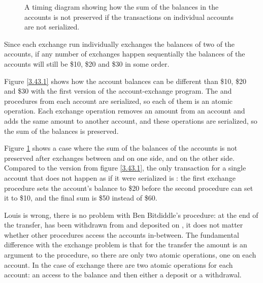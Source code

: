 \begin{exe}[3.43]
\begin{figure}
        \caption{A timing diagram showing how the sum of the balances in the 
        accounts is not preserved if the transactions on individual accounts are 
        not serialized.}
        \label{3.43.2}
    \end{figure}

    Since each exchange run individually exchanges the balances of two of the 
    accounts, if any number of exchanges happen sequentially the balances of the 
    accounts will still be \$10, \$20 and \$30 in some order.

    Figure \ref{3.43.1} shows how the account balances can be different than 
    \$10, \$20 and \$30 with the first version of the account-exchange program. 
    The  and  procedures from each account are 
    serialized, so each of them is an atomic operation. Each exchange operation 
    removes an amount from an account and adds the same amount to another 
    account, and these operations are serialized, so the sum of the balances is 
    preserved.

    Figure \ref{3.43.2} shows a case where the sum of the balances of the 
    accounts is not preserved after exchanges between  and  on 
    one side,  and  on the other side. Compared to the version 
    from figure \ref{3.43.1}, the only transaction for a single account that 
    does not happen as if it were serialized is : the 
    first exchange procedure sets the account’s balance to \$20 before the 
    second procedure can set it to \$10, and the final sum is \$50 instead of 
    \$60.
\end{exe}

\begin{exe}[3.44]
    Louis is wrong, there is no problem with Ben Bitdiddle’s procedure: at the 
    end of the transfer,  has been withdrawn from 
     and deposited on , it does not matter 
    whether other procedures access the accounts in-between. The fundamental 
    difference with the exchange problem is that for the transfer the amount is 
    an argument to the procedure, so there are only two atomic operations, one 
    on each account. In the case of exchange there are two atomic operations for 
    each account: an access to the balance and then either a deposit or 
    a withdrawal.
\end{exe}

